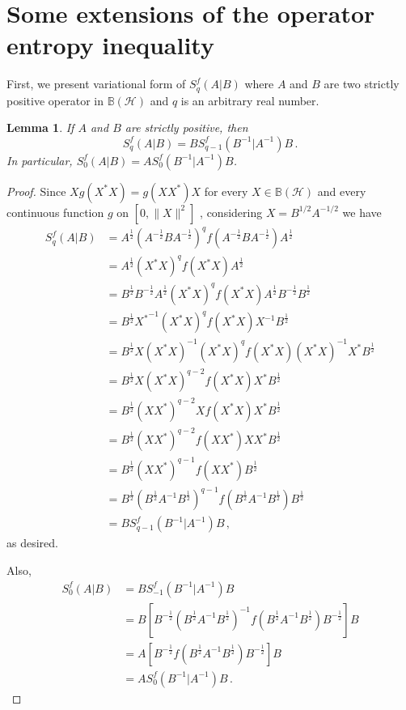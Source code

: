 \documentclass[12pt, reqno]{amsart}
\newtheorem{lemma}[theorem]{Lemma}
\theoremstyle{definition}
\theoremstyle{remark}
\numberwithin{equation}{section}
\begin{document}
\section{Some extensions of the operator entropy inequality}
First, we present variational form of $S_q^f(A|B)$ where $A$ and $B$ are two strictly positive operator in $\mathbb{B}(\mathscr{H})$ and $q$ is an arbitrary real number.
\begin{lemma}\label{l1}
If $A$ and $B$ are strictly positive, then
\begin{equation}\label{e2}
S_q^f(A|B)=B S_{q-1}^f\left(B^{-1}|A^{-1}\right) B\,.
\end{equation}
In particular, $S_0^f(A|B)=A S_0^f\left(B^{-1}|A^{-1}\right) B$.
\end{lemma}
\begin{proof} Since $Xg(X^*X)=g(XX^*)X$ for every $X\in\mathbb{B}(\mathscr{H})$ and every continuous function $g$ on $[0, \|X\|^2]$ \cite[Lemma 1.7]{FMPS}, considering $X=B^{1/2}A^{-1/2}$ we have
\begin{align*}
S_q^f(A|B)&=A^{\frac{1}{2}}\left(A^{-\frac{1}{2}}BA^{-\frac{1}{2}}\right)^q f\left(A^{-\frac{1}{2}}BA^{-\frac{1}{2}}\right)A^{\frac{1}{2}}\\
&=A^{\frac{1}{2}}\left(X^*X\right)^q f\left(X^*X\right)A^{\frac{1}{2}}\\
&=B^{\frac{1}{2}}B^{-\frac{1}{2}}A^{\frac{1}{2}} \left(X^*X\right)^q f\left(X^*X\right)A^{\frac{1}{2}}B^{-\frac{1}{2}}B^{\frac{1}{2}}\\
&=B^{\frac{1}{2}}{X^*}^{-1}\left(X^*X\right)^q f\left(X^*X\right)X^{-1}B^{\frac{1}{2}}\\
&=B^{\frac{1}{2}}X(X^*X)^{-1}\left(X^*X\right)^q f\left(X^*X\right)(X^*X)^{-1}X^*B^{\frac{1}{2}}\\
&=B^{\frac{1}{2}}X(X^*X)^{q-2} f\left(X^*X\right)X^*B^{\frac{1}{2}}\\
&=B^{\frac{1}{2}}(XX^*)^{q-2} X f\left(X^*X\right)X^*B^{\frac{1}{2}}\\
&=B^{\frac{1}{2}}(XX^*)^{q-2} f\left(XX^*\right) XX^*B^{\frac{1}{2}}\\
&=B^{\frac{1}{2}}(XX^*)^{q-1} f\left(XX^*\right)B^{\frac{1}{2}}\\
&=B^{\frac{1}{2}}\left(B^{\frac{1}{2}}A^{-1}B^{\frac{1}{2}}\right)^{q-1} f\left(B^{\frac{1}{2}}A^{-1}B^{\frac{1}{2}}\right)B^{\frac{1}{2}}\\
&=B S_{q-1}^f(B^{-1}|A^{-1}) B\,,
\end{align*}
as desired.

Also,
\begin{align*}
S_0^f(A|B)&=B S_{-1}^f(B^{-1}|A^{-1}) B\\
&=B\left[B^{-\frac{1}{2}}\left(B^{\frac{1}{2}}A^{-1}B^{\frac{1}{2}}\right)^{-1}f\left(B^{\frac{1}{2}}A^{-1}B^{\frac{1}{2}}\right)B^{-\frac{1}{2}}\right]B\\
&=A \left[B^{-\frac{1}{2}} f\left(B^{\frac{1}{2}}A^{-1}B^{\frac{1}{2}}\right)B^{-\frac{1}{2}}\right]B\\
&=A S_0^f\left(B^{-1}|A^{-1}\right) B\,.
\end{align*}
\end{proof}
\end{document}

